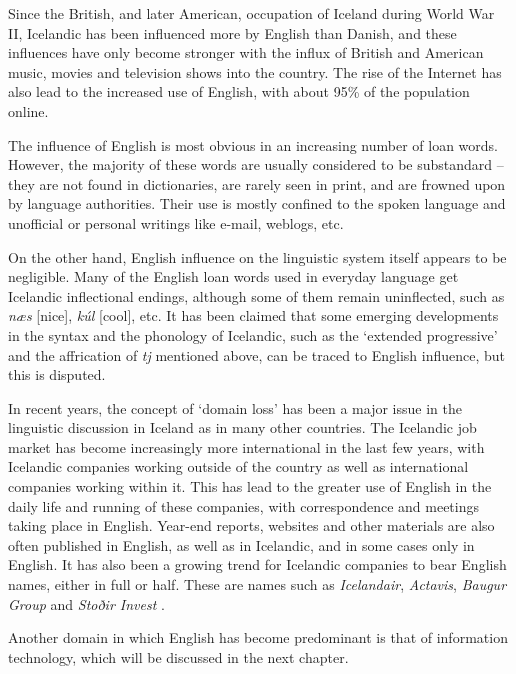 \begin{multicols}{2}
Since the British, and later American, occupation of Iceland during World War II, Icelandic has been influenced more by English than Danish, and these influences have only become stronger with the influx of British and American music, movies and television shows into the country. The rise of the Internet has also lead to the increased use of English, with about 95\% of the population online.

The influence of English is most obvious in an increasing number of loan words. However, the majority of these words are usually considered to be substandard -- they are not found in dictionaries, are rarely seen in print, and are frowned upon by language authorities. Their use is mostly confined to the spoken language and unofficial or personal writings like e-mail, weblogs, etc.


On the other hand, English influence on the linguistic system itself appears to be negligible. Many of the English loan words used in everyday language get Icelandic inflectional endings, although some of them remain uninflected, such as \textit{næs} {[}nice{]}, \textit{kúl} {[}cool{]}, etc. It has been claimed that some emerging developments in the syntax and the phonology of Icelandic, such as the ‘extended progressive’ and the affrication of \textit{tj} mentioned above, can be traced to English influence, but this is disputed.

In recent years, the concept of ‘domain loss’ has been a major issue in the linguistic discussion in Iceland as in many other countries. The Icelandic job market has become increasingly more international in the last few years, with Icelandic companies working outside of the country as well as international companies working within it. This has lead to the greater use of English in the daily life and running of these companies, with correspondence and meetings taking place in English. Year-end reports, websites and other materials are also often published in English, as well as in Icelandic, and in some cases only in English. It has also been a growing trend for Icelandic companies to bear English names, either in full or half. These are names such as \textit{Icelandair}, \textit{Actavis}, \textit{Baugur Group} and \textit{Stoðir Invest} \cite{isl1}.  

Another domain in which English has become predominant is that of information technology, which will be discussed in the next chapter.


\end{multicols}
